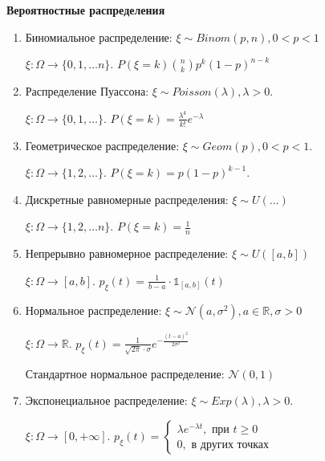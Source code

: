 \begin{example}
    \textbf{Вероятностные распределения}

    \begin{enumerate}
        \item {
            Биномиальное распределение: $\xi \sim Binom(p, n), 0 < p < 1$

            $\xi : \Omega \to \{ 0, 1, \ldots n \}$. $P(\xi = k) \binom{n}{k} p^k (1 - p)^{n - k}$ 
        }
        \item {
            Распределение Пуассона: $\xi \sim Poisson(\lambda), \lambda > 0$.

            $\xi : \Omega \to \{ 0, 1, \ldots \}$. $P(\xi = k) = \frac{\lambda^k}{k!}e^{-\lambda}$
        }
        \item {
            Геометрическое распределение: $\xi \sim Geom(p), 0 < p < 1$.

            $\xi : \Omega \to \{ 1, 2, \ldots \}$. $P(\xi = k) = p(1 - p)^{k - 1}$.
        }
        \item {
            Дискретные равномерные распределения: $\xi \sim U(\ldots)$

            $\xi : \Omega \to \{ 1, 2, \ldots n \}$. $P(\xi = k) = \frac{1}{n}$
        }
        \item {
            Непрерывно равномерное распределение: $\xi \sim U([a, b])$

            $\xi : \Omega \to [a, b]$. $p_{\xi}(t) = \frac{1}{b - a} \cdot \mathds{1}_{[a, b]} (t)$
        }
        \item {
            Нормальное распределение: $\xi \sim \mathcal{N} (a, \sigma^2), a \in \mathbb{R}, \sigma > 0$

            $\xi : \Omega \to \mathbb{R}$. $p_{\xi}(t) = \frac{1}{\sqrt{2\pi} \cdot \sigma} e^{-\frac{(t - a)^2}{2\sigma^2}}$

            Стандартное нормальное распределение: $\mathcal{N} (0, 1)$
        }
        \item { 
            Экспонециальное распределение: $\xi \sim Exp(\lambda), \lambda > 0$.

            $\xi : \Omega \to [0, +\infty]$. $p_{\xi}(t) = \begin{cases}
                \lambda e^{-\lambda t}, \text{ при } t \geqslant 0 \\
                0, \text{ в других точках}
            \end{cases}$
        }
    \end{enumerate}


\end{example}
